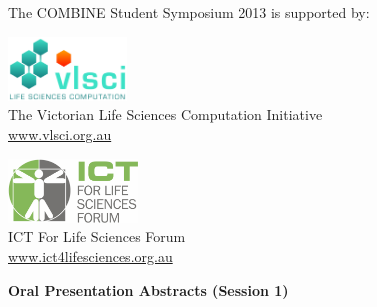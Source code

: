 \documentclass[10pt,]{article}
\begin{document}
\vspace{5ex}

\begin{minipage}[c]{\linewidth}
    \centering
    The COMBINE Student Symposium 2013 is supported by:\\[3ex]
    \begin{varwidth}[t]{0.33\linewidth}
        \centering
        \includegraphics[height=17mm,valign=M]{./images/logo_vlsci_3508x1890.jpg}\\[2ex]
        The Victorian Life Sciences Computation Initiative\\
        \href{http://www.vlsci.org.au}{www.vlsci.org.au}
    \end{varwidth}
    \qquad
    \begin{varwidth}[t]{0.33\linewidth}
        \centering
        \includegraphics[height=17mm,valign=M]{./images/ICT-for-Life-Sciences-Forum-logo.png}\\[2ex]
        ICT For Life Sciences Forum\\
        \href{http://ict4lifesciences.org.au/}{www.ict4lifesciences.org.au}
    \end{varwidth}
\end{minipage}

\vfill
\pagebreak
\null
\vfill

\small

{\Large\bfseries\centering Oral Presentation Abstracts (Session 1)}\\[3ex]
\end{document}
